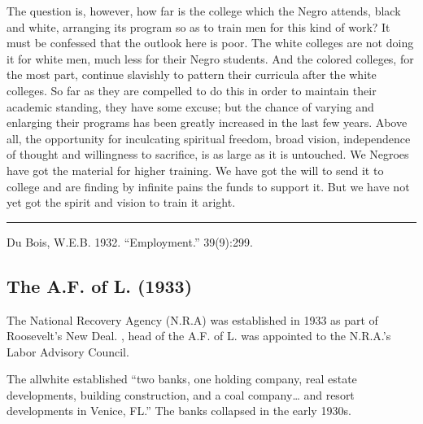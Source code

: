 \documentclass[letterpaper,10pt,english]{jupyterBook}
\begin{document}
\sphinxAtStartPar
The question is, however, how far is the college which the Negro attends, black and white, arranging its program so as to train men for this kind of work? It must be confessed that the outlook here is poor. The white colleges are not doing it for white men, much less for their Negro students. And the colored colleges, for the most part, continue slavishly to pattern their curricula after the white colleges. So far as they are compelled to do this in order to maintain their academic standing, they have some excuse; but the chance of varying and enlarging their programs has been greatly increased in the last few years. Above all, the opportunity for inculcating spiritual freedom, broad vision, independence of thought and willingness to sacrifice, is as large as it is untouched. We Negroes have got the material for higher training. We have got the will to send it to college and are finding by infinite pains the funds to support it. But we have not yet got the spirit and vision to train it aright.


\bigskip\hrule\bigskip


\sphinxAtStartPar
{} Du Bois, W.E.B. 1932. “Employment.” 39(9):299.


\subsection{The A.F. of L. (1933)}
\label{\detokenize{Volumes/40/12/af_of_l:the-a-f-of-l-1933}}\label{\detokenize{Volumes/40/12/af_of_l::doc}}
\begin{sphinxShadowBox}
\sphinxstylesidebartitle{}

\sphinxAtStartPar
The National Recovery Agency (N.R.A) was established in 1933 as part of Roosevelt’s New Deal. , head of the A.F. of L. was appointed to the N.R.A.’s Labor Advisory Council.

\sphinxAtStartPar
The all\sphinxhyphen{}white  established “two banks, one holding company, real estate developments, building construction, and a coal company… and resort developments in Venice, FL.” The banks collapsed in the early 1930s.
\end{sphinxShadowBox}
\end{document}
